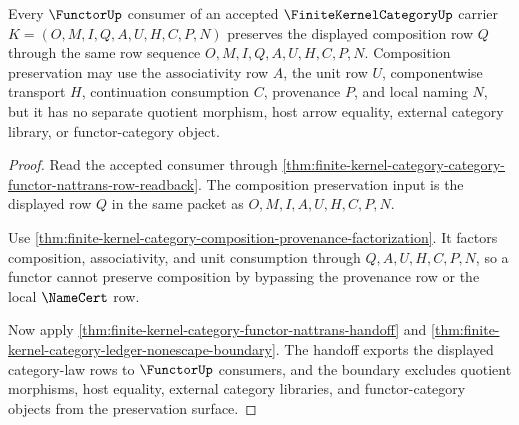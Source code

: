 \begin{theorem}
\label{thm:finite-kernel-category-functor-composition-preservation}
Every $\FunctorUp$ consumer of an accepted $\FiniteKernelCategoryUp$ carrier
$K=(O,M,I,Q,A,U,H,C,P,N)$ preserves the displayed composition row $Q$ through
the same row sequence $O,M,I,Q,A,U,H,C,P,N$. Composition preservation may use
the associativity row $A$, the unit row $U$, componentwise transport $H$,
continuation consumption $C$, provenance $P$, and local naming $N$, but it has
no separate quotient morphism, host arrow equality, external category library,
or functor-category object.
\end{theorem}
\begin{proof}
Read the accepted consumer through
\autoref{thm:finite-kernel-category-category-functor-nattrans-row-readback}.
The composition preservation input is the displayed row $Q$ in the same packet
as $O,M,I,A,U,H,C,P,N$.

Use \autoref{thm:finite-kernel-category-composition-provenance-factorization}.
It factors composition, associativity, and unit consumption through
$Q,A,U,H,C,P,N$, so a functor cannot preserve composition by bypassing the
provenance row or the local $\NameCert$ row.

Now apply \autoref{thm:finite-kernel-category-functor-nattrans-handoff} and
\autoref{thm:finite-kernel-category-ledger-nonescape-boundary}. The handoff
exports the displayed category-law rows to $\FunctorUp$ consumers, and the
boundary excludes quotient morphisms, host equality, external category
libraries, and functor-category objects from the preservation surface.
\end{proof}

